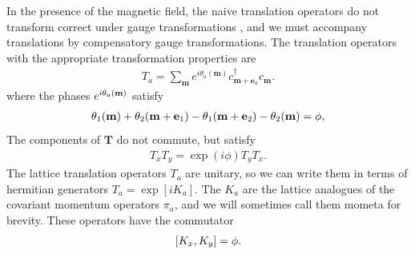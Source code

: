 \documentclass[aps,prb,twocolumn,letterpaper,twoside,nobalancelastpage,groupedaddress,amsmath,amssymb,floatfix,citeautoscript]{revtex4-1}
\begin{document}
In the presence of the magnetic field, the naive translation operators do not transform correct under gauge transformations \cite{fradkin_field_2013}, and we must accompany translations by compensatory gauge transformations. The translation operators with the appropriate transformation properties are
\begin{align*}
T_a = \sum_{\mathbf{m}} e^{i\theta_a(\mathbf{m})} c^{\dag}_{\mathbf{m} + \mathbf{e}_a}c_{\mathbf{m}}.
\end{align*}
where the phases $e^{i\theta_a(\mathbf{m})}$ satisfy 
\begin{align*}
\theta_1(\mathbf{m}) + \theta_2(\mathbf{m} + \mathbf{e}_1) - \theta_1(\mathbf{m} + \mathbf{e}_2) - \theta_2(\mathbf{m}) = \phi,
\end{align*}
The components of $\mathbf{T}$ do not commute, but satisfy 
\begin{align*}
T_x T_y = \exp(i\phi) T_y T_x.
\end{align*}
The lattice translation operators $T_a$ are unitary, so we can write them in terms of hermitian generators $T_a = \exp\left[i K_a\right]$. The $K_a$ are the lattice analogues of the covariant momentum operators $\pi_a$, and we will sometimes call them mometa for brevity. These operators have the commutator
\begin{align*}
\comm{K_x}{K_y} = \phi.
\end{align*}

\end{document}
